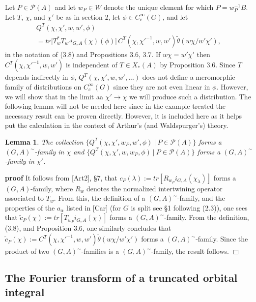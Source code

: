 \documentclass[12pt]{article}
\newtheorem{lemma}{Lemma}[section]
\newenvironment{pf}[1][proof:]{\par\medskip\noindent\textbf{#1} }{\par\medskip}
\begin{document}
Let $P\in\mathcal{P}(A)$ and let $w_P\in W$ denote the unique element for which $P=w_P^{-1}B$. Let $T$, $\chi$, and $\chi'$ be as in section 2, let $\phi\in C_c^\infty(G)$, and let
\begin{equation}\tag{4.1}
\begin{array}{c}
Q^T(\chi,\chi',w,w',\phi)\\
=tr\big[T^*_wT_{w'}i_{G,A}(\chi)(\phi)\big]\,C^T(\chi,\chi'^{-1},w,w')\tilde\theta(w\chi/w'\chi'),
\end{array}
\end{equation}
in the notation of (3.8) and Propositions 3.6, 3.7. If $w\chi=w'\chi'$ then $C^T(\chi,\chi'^{-1},w,w')$ is independent of $T\in X_*(A)$ by Proposition 3.6. Since $T$ depends indirectly in $\phi$, $Q^T(\chi,\chi',w,w',...)$ does not define a meromorphic family of distributions on $C_c^\infty(G)$ since they are not even linear in $\phi$. However, we will show that in the limit aa $\chi'\rightarrow\chi$ we will produce such a distribution. The following lemma will not be needed here since in the example treated the necessary result can be proven directly. However, it is included here as it helps put the calculation in the context of Arthur's (and Waldspurger's) theory.

\begin{lemma}
The collection $\{Q^T(\chi,\chi',w_P,w',\phi)\ |\ P\in\mathcal{P}(A)\}$ forms a $(G,A)^\sim$-family in $\chi$ and $\{Q^T(\chi,\chi',w,w_P,\phi)\ |\ P\in\mathcal{P}(A)\}$ forms a $(G,A)^\sim$-family in $\chi'$.
\end{lemma}

\begin{pf}[proof]
It follows from [Art2], \S7, that $c_P(\lambda):=tr[R_{w_P}i_{G,A}(\chi_\lambda)]$ forms a $(G,A)$-family, where $R_w$ denotes the normalized intertwining operator associated to $T_w$. From this, the definition of a $(G,A)^\sim$-family, and the properties of the $a_\alpha$ listed in [Car] (for $G$ is split see \S1 following (2.3)), one sees that $\tilde{c}_P(\chi):=tr[T_{w_P}i_{G,A}(\chi)]$ forms a $(G,A)^\sim$-family. From the definition, (3.8), and Proposition 3.6, one similarly concludes that $\tilde{c}_P(\chi):=C^T(\chi,\chi'^{-1},w,w')\tilde\theta(w\chi/w'\chi')$ forms a $(G,A)^\sim$-family. Since the product of two $(G,A)^\sim$-families is a $(G,A)^\sim$-family, the result follows. $\Box$
\end{pf}

\subsection{The Fourier transform of a truncated orbital integral}
\end{document}
